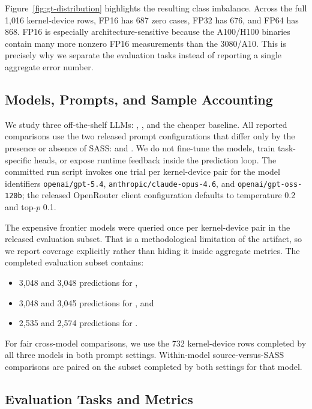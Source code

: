 Figure~\ref{fig:gt-distribution} highlights the resulting class imbalance.
Across the full 1{,}016 kernel-device rows, FP16 has 687 zero cases, FP32 has 676, and FP64 has 868.
FP16 is especially architecture-sensitive because the A100/H100 binaries contain many more nonzero FP16 measurements than the 3080/A10.
This is precisely why we separate the evaluation tasks instead of reporting a single aggregate error number.

\subsection{Models, Prompts, and Sample Accounting}

We study three off-the-shelf LLMs: \gptfivefour, \opus, and the cheaper \gptoss baseline.
All reported comparisons use the two released prompt configurations that differ only by the presence or absence of SASS: \sourceonly and \sourcesass.
We do not fine-tune the models, train task-specific heads, or expose runtime feedback inside the prediction loop.
The committed run script invokes one trial per kernel-device pair for the model identifiers \texttt{openai/gpt-5.4}, \texttt{anthropic/claude-opus-4.6}, and \texttt{openai/gpt-oss-120b}; the released OpenRouter client configuration defaults to temperature 0.2 and top-$p$ 0.1.

The expensive frontier models were queried once per kernel-device pair in the released evaluation subset.
That is a methodological limitation of the artifact, so we report coverage explicitly rather than hiding it inside aggregate metrics.
The completed evaluation subset contains:
\begin{itemize}[leftmargin=1.2em]
  \item 3{,}048 \sourcesass and 3{,}048 \sourceonly predictions for \opus,
  \item 3{,}048 \sourcesass and 3{,}045 \sourceonly predictions for \gptfivefour, and
  \item 2{,}535 \sourcesass and 2{,}574 \sourceonly predictions for \gptoss.
\end{itemize}
For fair cross-model comparisons, we use the 732 kernel-device rows completed by all three models in both prompt settings.
Within-model source-versus-SASS comparisons are paired on the subset completed by both settings for that model.

\subsection{Evaluation Tasks and Metrics}

